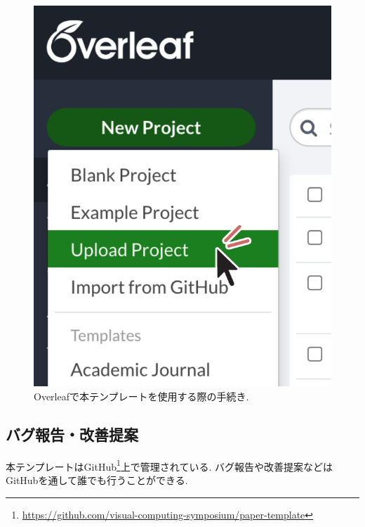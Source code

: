 \documentclass{vc}
\begin{document}
\begin{figure}
  \centering
  \includegraphics[width=.5\columnwidth]{./figures/overleaf.pdf}
  \caption{Overleafで本テンプレートを使用する際の手続き.}
  \label{fig:overleaf}
\end{figure}

\subsection{バグ報告・改善提案}

本テンプレートはGitHub\footnote{\url{https://github.com/visual-computing-symposium/paper-template}}上で管理されている.
バグ報告や改善提案などはGitHubを通して誰でも行うことができる.



\end{document}
